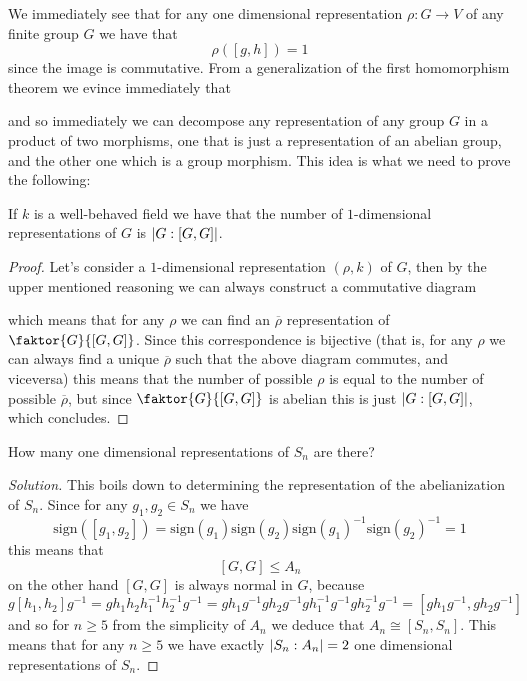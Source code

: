 \documentclass[11pt]{scrartcl}
\begin{document}
	We immediately see that for any one dimensional representation $\rho:G\to V$ of any finite group $G$ we have that
	$$\rho([g,h])=1$$
	since the image is commutative. From a generalization of the first homomorphism theorem we evince immediately that
	\begin{center}
	\end{center}
	and so immediately we can decompose any representation of any group $G$ in a product of two morphisms, one that is just a representation of an abelian group, and the other one which is a group morphism. This idea is what we need to prove the following:
	\begin{proposition}
		If $k$ is a well-behaved field we have that the number of $1$-dimensional representations of $G$ is $\left\lvert G:[G,G] \right\rvert$.
	\end{proposition}
	\begin{proof}
		Let's consider a $1$-dimensional representation $(\rho,k)$ of $G$, then by the upper mentioned reasoning we can always construct a commutative diagram
		\begin{center}
		\end{center} 
		which means that for any $\rho$ we can find an $\overline{\rho}$ representation of $\faktor{G}{[G,G]}$. Since this correspondence is bijective (that is, for any $\rho$ we can always find a unique $\overline{\rho}$ such that the above diagram commutes, and viceversa) this means that the number of possible $\rho$ is equal to the number of possible $\overline{\rho}$, but since $\faktor{G}{[G,G]}$ is abelian this is just $\left\lvert G:[G,G] \right\rvert$, which concludes.
	\end{proof}
	\begin{example}
		How many one dimensional representations of $S_n$ are there? 
	\end{example}
	\begin{proof}[Solution]
		This boils down to determining the representation of the abelianization of $S_n$. Since for any $g_1,g_2\in S_n$ we have
		$$\text{sign}([g_1,g_2])=\text{sign}(g_1)\text{sign}(g_2)\text{sign}(g_1)^{-1}\text{sign}(g_2)^{-1}=1$$
		this means that
		$$[G,G]\le A_n$$
		on the other hand $[G,G]$ is always normal in $G$, because
		$$g[h_1,h_2]g^{-1}=gh_1h_2h_1^{-1}h_2^{-1}g^{-1}=gh_1g^{-1}gh_2g^{-1}gh_1^{-1}g^{-1}gh_2^{-1}g^{-1}=[gh_1g^{-1},gh_2g^{-1}]$$
		and so for $n\ge 5$ from the simplicity of $A_n$ we deduce that $A_n\cong [S_n,S_n]$. This means that for any $n\ge 5$ we have exactly $\left\lvert S_n:A_n \right\rvert=2$ one dimensional representations of $S_n$.
	\end{proof}
	
\end{document}
